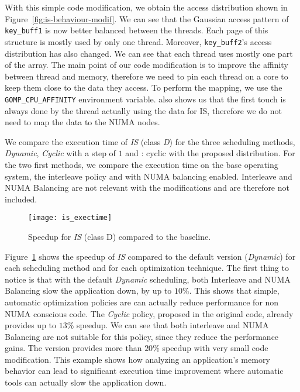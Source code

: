 With this simple code modification, we obtain the access distribution
shown in Figure~\ref{fig:is-behaviour-modif}. We can see that the Gaussian
access pattern of \texttt{key\_buff1} is now better balanced between the threads. Each page
of this structure is mostly used by only one thread. Moreover,
\texttt{key\_buff2}'s access distribution has also changed. We can see that
each thread uses mostly one part of the array.
The main point of our code modification is to improve the affinity between
thread and memory, therefore we need to pin each thread on a core to keep them
close to the data they access. To perform the mapping, we use the \texttt{GOMP\_CPU\_AFFINITY} environment variable. \TABARNAC
also shows us that the first touch is always done by the thread actually using
the data for IS, therefore we do not need to map the data to the NUMA nodes.

We compare the execution time of \emph{IS} (class \emph{D}) for the three scheduling
methods, \emph{Dynamic}, \emph{Cyclic} with a step of $1$ and \TABARNAC:
cyclic with the proposed distribution. For the two first methods, we compare the
execution time on the base operating system, the interleave policy and with NUMA balancing enabled. Interleave and NUMA Balancing are not relevant with the
\TABARNAC modifications and are therefore not included.

\begin{figure}[!p]
    \centering
    \texttt{[image: is\_exectime]}
    \vspace{-5mm}
    \caption{Speedup for \emph{IS} (class D) compared to the baseline.}
\label{fig:is-res}
\end{figure}

Figure~\ref{fig:is-res} shows the speedup of \emph{IS} compared to
the default version (\emph{Dynamic}) for each scheduling method and for each
optimization technique. The first thing to notice is that with the default
\emph{Dynamic} scheduling, both Interleave and NUMA Balancing slow
the application down, by up to $10\%$. This shows that simple, automatic optimization policies are can actually reduce performance
for non NUMA conscious code.
The \emph{Cyclic} policy, proposed in the original code, already provides up to $13\%$
speedup. We can see that both interleave and NUMA Balancing are not suitable
for this policy, since they reduce the performance gains.
The \TABARNAC version provides more than $20\%$ speedup with very small code
modification.
This example shows how analyzing an application's memory behavior can lead to
significant execution time improvement where automatic tools can actually slow
the application down.

